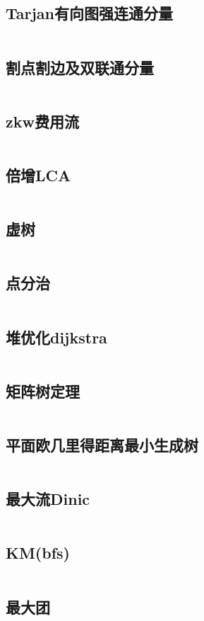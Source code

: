 \documentclass[UTF8]{ctexart}
\begin{document}
\subsection{Tarjan有向图强连通分量}
\inputminted{cpp}{graphtheory/Tarjan有向图强连通分量.cpp}
\subsection{割点割边及双联通分量}
\inputminted{cpp}{graphtheory/割点割边及双联通分量.cpp}
\subsection{zkw费用流}
\inputminted{cpp}{graphtheory/zkw费用流.cpp}
\subsection{倍增LCA}
\inputminted{cpp}{graphtheory/倍增LCA.cpp}
\subsection{虚树}
\inputminted{cpp}{datastructure/VirtualTree.cpp}
\subsection{点分治}
\inputminted{cpp}{graphtheory/点分治.cpp}
\subsection{堆优化dijkstra}
\inputminted{cpp}{graphtheory/堆优化dijkstra.cpp}
\subsection{矩阵树定理}
\inputminted{cpp}{graphtheory/矩阵树定理.cpp}
\subsection{平面欧几里得距离最小生成树}
\inputminted{cpp}{graphtheory/平面欧几里得距离最小生成树.cpp}
\subsection{最大流Dinic}
\inputminted{cpp}{graphtheory/最大流Dinic.cpp}
\subsection{KM(bfs)}
\inputminted{cpp}{graphtheory/KM_bfs.cpp}
\subsection{最大团}
\inputminted{cpp}{graphtheory/最大团.cpp}
\end{document}
